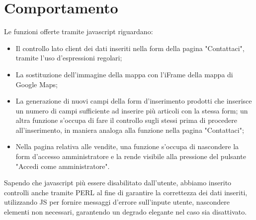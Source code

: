 \section{Comportamento}{
	Le funzioni offerte tramite javascript riguardano: 
	\begin{itemize}
		\item Il controllo lato client dei dati inseriti nella form della pagina "Contattaci", tramite l'uso d'espressioni regolari;
		\item La sostituzione dell'immagine della mappa con l'iFrame della mappa di Google Maps;
		\item La generazione di nuovi campi della form d'inserimento prodotti che inserisce un numero di campi sufficiente ad inserire più articoli con la stessa form; un altra funzione s'occupa di fare il controllo sugli stessi prima di procedere all'inserimento, in maniera analoga alla funzione nella pagina "Contattaci";
		\item Nella pagina relativa alle vendite, una funzione s'occupa di nascondere la form d'accesso amministratore e la rende visibile alla pressione del pulsante "Accedi come amministratore".
	\end{itemize}%
	Sapendo che javascript più essere disabilitato dall'utente, abbiamo inserito controlli anche tramite PERL al fine di garantire la correttezza dei dati inseriti, utilizzando JS per fornire messaggi d'errore sull'inpute utente, nascondere elementi non necessari, garantendo un degrado elegante nel caso sia disattivato.
}